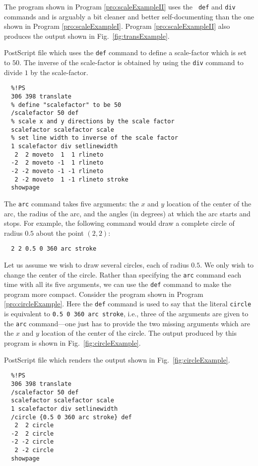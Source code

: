 The program shown in Program \ref{pro:scaleExampleII} uses the {\tt
def} and {\tt div} commands and is arguably a bit cleaner and better
self-documenting than the one shown in Program
\ref{pro:scaleExampleI}.  Program \ref{pro:scaleExampleII} also
produces the output shown in Fig.\ \ref{fig:transExample}.  
\begin{program}
PostScript file which uses the {\tt def} command to define a
scale-factor which is set to $50$.  The inverse of the scale-factor is
obtained by using the {\tt div} command to divide $1$ by the scale-factor.
\label{pro:scaleExampleII}
\codemiddle
\begin{verbatim}
  %!PS
  306 398 translate
  % define "scalefactor" to be 50
  /scalefactor 50 def
  % scale x and y directions by the scale factor
  scalefactor scalefactor scale
  % set line width to inverse of the scale factor
  1 scalefactor div setlinewidth
   2  2 moveto  1  1 rlineto
  -2  2 moveto -1  1 rlineto
  -2 -2 moveto -1 -1 rlineto
   2 -2 moveto  1 -1 rlineto stroke
  showpage
\end{verbatim}
\end{program}

The {\tt arc} command takes five arguments: the $x$ and $y$ location
of the center of the arc, the radius of the arc, and the angles (in degrees) at
which the arc starts and stops.  For example, the following command
would draw a complete circle of radius $0.5$ about the point $(2,2)$:
\begin{verbatim}
  2 2 0.5 0 360 arc stroke
\end{verbatim}
Let us assume we wish to draw several circles, each of radius $0.5$.
We only wish to change the center of the circle.  Rather than
specifying the {\tt arc} command each time with all its five
arguments, we can use the {\tt def} command to make the program more
compact.  Consider the program shown in Program
\ref{pro:circleExample}.  Here the {\tt def} command is used to say
that the literal {\tt circle} is equivalent to {\tt 0.5 0 360 arc
stroke}, i.e., three of the arguments are given to the {\tt arc}
command---one just has to provide the two missing arguments which are
the $x$ and $y$ location of the center of the circle.  The output
produced by this program is shown in Fig.\
\ref{fig:circleExample}.
\begin{program}
PostScript file which renders the output shown in Fig.\
\ref{fig:circleExample}.
\label{pro:circleExample}
\codemiddle
\begin{verbatim}
  %!PS
  306 398 translate
  /scalefactor 50 def
  scalefactor scalefactor scale
  1 scalefactor div setlinewidth
  /circle {0.5 0 360 arc stroke} def
   2  2 circle
  -2  2 circle
  -2 -2 circle
   2 -2 circle
  showpage
\end{verbatim}
\end{program}

